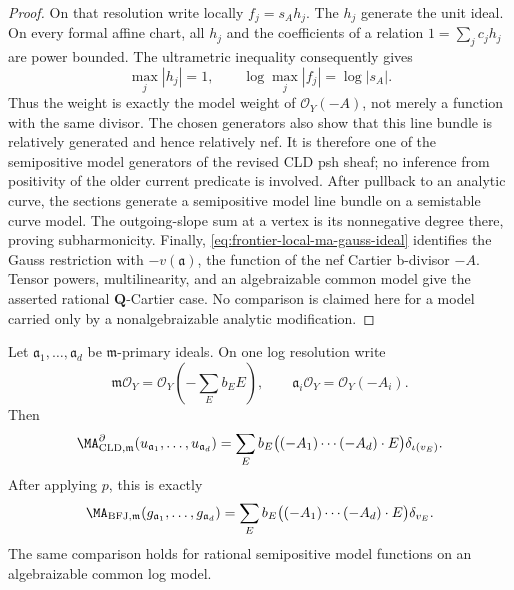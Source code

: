 \begin{proof}
On that resolution write locally \(f_j=s_Ah_j\).  The \(h_j\) generate the
unit ideal.  On every formal affine chart, all \(h_j\) and the coefficients
of a relation \(1=\sum_jc_jh_j\) are power bounded.  The ultrametric
inequality consequently gives
\[
                    \max_j|h_j|=1,
 \qquad
                    \log\max_j|f_j|=\log|s_A|.
\]
Thus the weight is exactly the model weight of
\(\mathcal O_Y(-A)\), not merely a function with the same divisor.  The
chosen generators also show that this line bundle is relatively generated
and hence relatively nef.  It is therefore one of the semipositive model
generators of the revised CLD psh sheaf; no inference from positivity of the
older current predicate is involved.  After pullback to an analytic curve,
the sections generate a semipositive model line bundle on a semistable curve
model.  The outgoing-slope sum at a vertex is its nonnegative degree there,
proving subharmonicity.  Finally,
\eqref{eq:frontier-local-ma-gauss-ideal} identifies the Gauss restriction
with \(-v(\mathfrak a)\), the function of the nef Cartier b-divisor \(-A\).
Tensor powers, multilinearity, and an algebraizable common model give the
asserted rational \(\mathbf Q\)-Cartier case.  No comparison is claimed here
for a model carried only by a nonalgebraizable analytic modification.
\end{proof}

\begin{theorem}\label{thm:frontier-local-ma-model-comparison}
Let \(\mathfrak a_1,\ldots,\mathfrak a_d\) be
\(\mathfrak m\)-primary ideals.  On one log resolution write
\[
 \mathfrak m\mathcal O_Y=\mathcal O_Y\!\left(-\sum_Eb_EE\right),
 \qquad
 \mathfrak a_i\mathcal O_Y=\mathcal O_Y(-A_i).
\]
Then
\begin{equation}
 \MA^{\partial}_{\mathrm{CLD},\mathfrak m}
       (u_{\mathfrak a_1},\ldots,u_{\mathfrak a_d})
 =\sum_E b_E\bigl((-A_1)\cdots(-A_d)\cdot E\bigr)
       \delta_{\iota(v_E)}.
 \label{eq:frontier-local-ma-cld-atomic}
\end{equation}
After applying \(p\), this is exactly
\begin{equation}
 \MA_{\mathrm{BFJ},\mathfrak m}
       (g_{\mathfrak a_1},\ldots,g_{\mathfrak a_d})
 =\sum_E b_E\bigl((-A_1)\cdots(-A_d)\cdot E\bigr)
       \delta_{v_E}.
 \label{eq:frontier-local-ma-bfj-atomic}
\end{equation}
The same comparison holds for rational semipositive model functions on an
algebraizable common log model.
\end{theorem}


